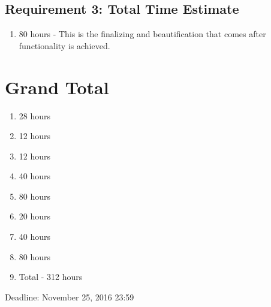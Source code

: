 \documentclass [10pt] {article}
\begin{document}
\subsection{Requirement 3: Total Time Estimate}
\begin{enumerate}
\item 80 hours - This is the finalizing and beautification that comes after functionality is achieved.
\end{enumerate}

\section{Grand Total}
\begin{enumerate}
\item 28 hours
\item 12 hours
\item 12 hours
\item 40 hours
\item 80 hours
\item 20 hours
\item 40 hours
\item 80 hours
\item Total - 312 hours
\end{enumerate}

Deadline: November 25, 2016 23:59
\end{document}
